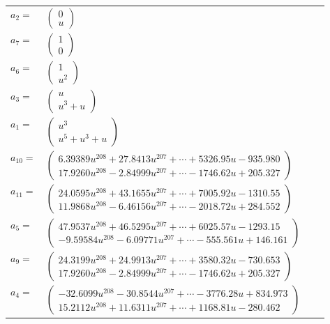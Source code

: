 \documentclass[1p]{elsarticle_modified}
\theoremstyle{definition}
\begin{document}
\begin{tabular}{m{7pt} m{180pt} m{7pt} m{180pt} }
\flushright $a_{2}=$&$\begin{pmatrix}0\\u\end{pmatrix}$ \\
\flushright $a_{7}=$&$\begin{pmatrix}1\\0\end{pmatrix}$ \\
\flushright $a_{6}=$&$\begin{pmatrix}1\\u^2\end{pmatrix}$ \\
\flushright $a_{3}=$&$\begin{pmatrix}u\\u^3+u\end{pmatrix}$ \\
\flushright $a_{1}=$&$\begin{pmatrix}u^3\\u^5+u^3+u\end{pmatrix}$ \\
\flushright $a_{10}=$&$\begin{pmatrix}6.39389 u^{208}+27.8413 u^{207}+\cdots+5326.95 u-935.980\\17.9260 u^{208}-2.84999 u^{207}+\cdots-1746.62 u+205.327\end{pmatrix}$ \\
\flushright $a_{11}=$&$\begin{pmatrix}24.0595 u^{208}+43.1655 u^{207}+\cdots+7005.92 u-1310.55\\11.9868 u^{208}-6.46156 u^{207}+\cdots-2018.72 u+284.552\end{pmatrix}$ \\
\flushright $a_{5}=$&$\begin{pmatrix}47.9537 u^{208}+46.5295 u^{207}+\cdots+6025.57 u-1293.15\\-9.59584 u^{208}-6.09771 u^{207}+\cdots-555.561 u+146.161\end{pmatrix}$ \\
\flushright $a_{9}=$&$\begin{pmatrix}24.3199 u^{208}+24.9913 u^{207}+\cdots+3580.32 u-730.653\\17.9260 u^{208}-2.84999 u^{207}+\cdots-1746.62 u+205.327\end{pmatrix}$ \\
\flushright $a_{4}=$&$\begin{pmatrix}-32.6099 u^{208}-30.8544 u^{207}+\cdots-3776.28 u+834.973\\15.2112 u^{208}+11.6311 u^{207}+\cdots+1168.81 u-280.462\end{pmatrix}$ \\

\end{tabular}
\end{document}
